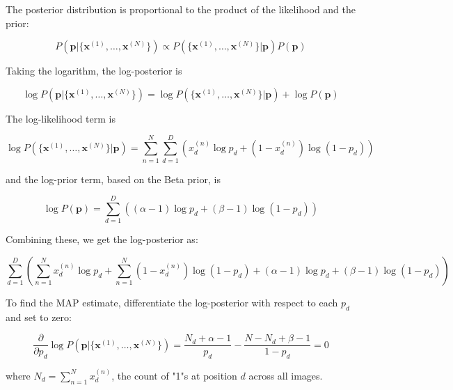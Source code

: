 \documentclass{article}
\begin{document}
\begin{enumerate}
    The posterior distribution is proportional to the product of the likelihood and the prior:
    
    \begin{equation}
    P(\mathbf{p} | \{\mathbf{x}^{(1)}, \ldots, \mathbf{x}^{(N)}\}) \propto P(\{\mathbf{x}^{(1)}, \ldots, \mathbf{x}^{(N)}\} | \mathbf{p}) P(\mathbf{p})
    \end{equation}
    
    Taking the logarithm, the log-posterior is
    
    \begin{equation}
    \log P(\mathbf{p} | \{\mathbf{x}^{(1)}, \ldots, \mathbf{x}^{(N)}\}) = \log P(\{\mathbf{x}^{(1)}, \ldots, \mathbf{x}^{(N)}\} | \mathbf{p}) + \log P(\mathbf{p})
    \end{equation}
    
    The log-likelihood term is
    
    \begin{equation}
    \log P(\{\mathbf{x}^{(1)}, \ldots, \mathbf{x}^{(N)}\} | \mathbf{p}) = \sum_{n=1}^N \sum_{d=1}^D \left( x_d^{(n)} \log p_d + (1 - x_d^{(n)}) \log (1 - p_d) \right)
    \end{equation}
    
    and the log-prior term, based on the Beta prior, is
    
    \begin{equation}
    \log P(\mathbf{p}) = \sum_{d=1}^D \left( (\alpha - 1) \log p_d + (\beta - 1) \log (1 - p_d) \right)
    \end{equation}
    
    Combining these, we get the log-posterior as:
    
    \begin{equation}
    \sum_{d=1}^D \left( \sum_{n=1}^N x_d^{(n)} \log p_d + \sum_{n=1}^N (1 - x_d^{(n)}) \log (1 - p_d) + (\alpha - 1) \log p_d + (\beta - 1) \log (1 - p_d) \right)
    \end{equation}
    
    To find the MAP estimate, differentiate the log-posterior with respect to each \(p_d\) and set to zero:
    
    \begin{equation}
    \frac{\partial}{\partial p_d} \log P(\mathbf{p} | \{\mathbf{x}^{(1)}, \ldots, \mathbf{x}^{(N)}\}) = \frac{N_d + \alpha - 1}{p_d} - \frac{N - N_d + \beta - 1}{1 - p_d} = 0
    \end{equation}
    
    where \(N_d = \sum_{n=1}^N x_d^{(n)}\), the count of "1"s at position \(d\) across all images.


\end{enumerate}
\end{document}

